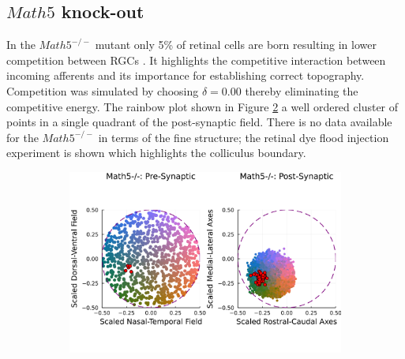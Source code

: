 \subsection{$Math5$ knock-out}
In the $Math5^{-/-}$ mutant only 5\% of retinal cells are born resulting in lower competition between RGCs \cite{Triplett2011-jk}. It highlights the competitive interaction between incoming afferents and its importance for establishing correct topography. Competition was simulated by choosing $\delta = 0.00$ thereby eliminating the competitive energy. The rainbow plot shown in Figure \ref{fig:math5_rainbow} a well ordered cluster of points in a single quadrant of the post-synaptic field. There is no data available for the $Math5^{-/-}$ in terms of the fine structure; the retinal dye flood injection experiment is shown which highlights the colliculus boundary.
\begin{figure}
	\begin{subfigure}{\textwidth}
		\centering
		\includegraphics[width=\textwidth]{images/distributed_kernels/figure_distributed_kernels_math5}
		\caption{\label{fig:math5_rainbow}}
		

\end{subfigure}
\end{figure}
